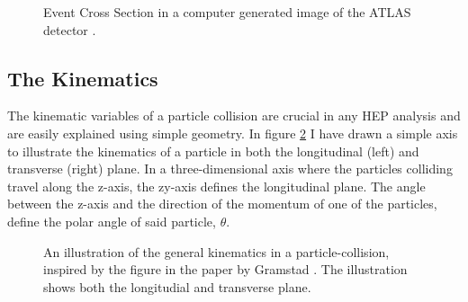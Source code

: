 \begin{figure}
    \centering
    \caption{Event Cross Section in a computer generated image of the
    ATLAS detector \cite{PDetector}.}
    \label{fig:detector}
\end{figure}

\subsection{The Kinematics}
The kinematic variables of a particle collision are crucial in any \ac{HEP} analysis and are easily explained using simple 
geometry. In figure \ref{fig:Kinematics} I have drawn a simple axis to illustrate the kinematics of a particle in both the 
longitudinal (left) and transverse (right) plane. In a three-dimensional axis where the particles colliding travel along the 
z-axis, the zy-axis defines the longitudinal plane.  The angle between the z-axis and the direction of the momentum of
one of the particles, define the polar angle of said particle, $\theta$.

\begin{figure}
    \centering
    \caption{An illustration of the general kinematics in a particle-collision, inspired by the 
    figure in the paper by Gramstad \cite{gramstad_searches_nodate}. The illustration shows both the 
    longitudial and transverse plane. }
    \label{fig:Kinematics}
\end{figure}
